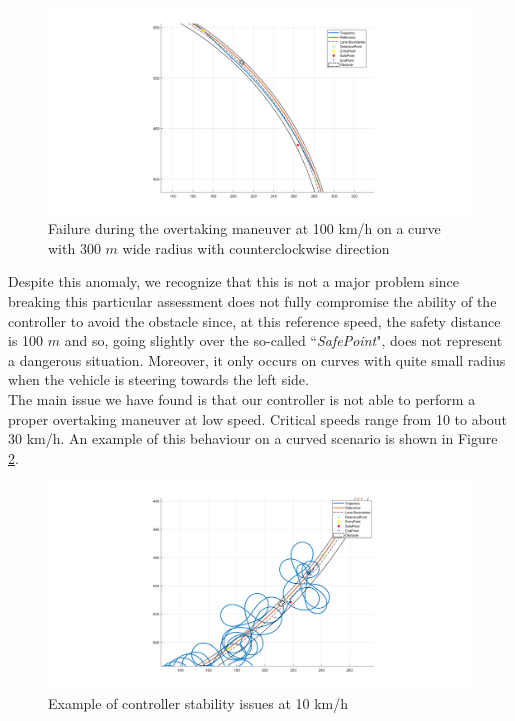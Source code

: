 \begin{figure}[H]
    \centering
    \includegraphics[width=1.1\textwidth,keepaspectratio]{Figures/fail100kmh.png}
    \caption{Failure during the overtaking maneuver at 100 km/h on a curve with 300 $m$ wide radius with counterclockwise direction }
    \label{fig:fail100kmh}
\end{figure}
Despite this anomaly, we recognize that this is not a major problem since breaking this particular assessment does not fully compromise the ability of the controller to avoid the obstacle since, at this reference speed, the safety distance is 100 $m$ and so, going slightly over the so-called ``\textit{SafePoint}", does not represent a dangerous situation. Moreover, it only occurs on curves with quite small radius when the vehicle is steering towards the left side.\\


The main issue we have found is that our controller is not able to perform a proper overtaking maneuver at low speed. Critical speeds range from 10 to about 30 km/h. An example of this behaviour on a curved scenario is shown in Figure \ref{fig:controller_madness}.
\begin{figure}[H]
    \centering
    \includegraphics[width=1\textwidth,keepaspectratio]{Figures/Failed300m10kmh.png}
    \caption{Example of controller stability issues at 10 km/h}
    \label{fig:controller_madness}
\end{figure}

